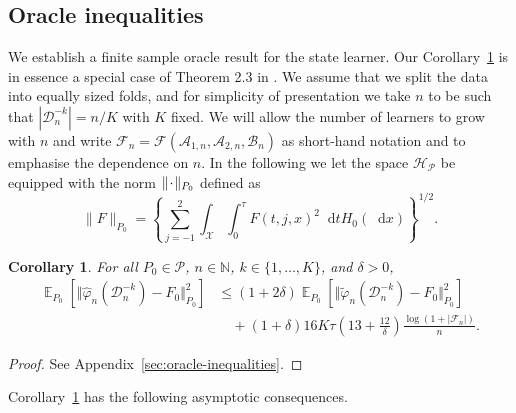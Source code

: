 \documentclass[a4paper,danish]{article}
\theoremstyle{plain} %
\numberwithin{theorem}{section}
\newtheorem{corollary}[theorem]{Corollary}
\theoremstyle{definition} %
\theoremstyle{remark}
\DeclareMathOperator{\E}{\mathbb{E}} %
\newcommand{\N}{\mathbb{N}}
\newcommand{\blank}{\makebox[1ex]{\textbf{$\cdot$}}}
\renewcommand{\phi}{\varphi}
\newcommand*\diff{\mathop{}\!\mathrm{d}}
\newcommand{\1}{\mathds{1}}
\newcommand{\data}{\ensuremath{\mathcal{D}}}
\begin{document}
\subsection{Oracle inequalities}
\label{sec:finite-sample-oracle}

We establish a finite sample oracle result for the state learner. Our
Corollary~\ref{cor:oracle-prop} is in essence a special case of
Theorem 2.3 in \citep{vaart2006oracle}.  We assume that we split the
data into equally sized folds, and for simplicity of presentation we
take \( n \) to be such that \( |\data_n^{-k}| = n/K \) with \( K \)
fixed. We will allow the number of learners to grow with \( n \) and
write
\( \mathcal{F}_n=\mathcal{F}(\mathcal{A}_{1,n}, \mathcal{A}_{2,n},
\mathcal{B}_n)\) as short-hand notation and to emphasise the
dependence on \( n \).
In the following we let the space \( \mathcal{H}_{\mathcal{P}} \) be equipped with the norm
\( \| \blank \|_{P_0} \) defined as
\begin{equation}
  \label{eq:norm}
  \| F \|_{P_0} = 
  \left\{
    \sum_{j=-1}^{2}\int_{\mathcal{X}} \int_0^{\tau} F(t, j, x)^2 \diff t H_0( \diff x)
  \right\}^{1/2}.
\end{equation}

\begin{corollary}
  \label{cor:oracle-prop}
  For all \(P_0\in\mathcal{P}\), \( n \in \N \), \( k \in \{1, \dots, K\} \),
  and $\delta>0$,
  \begin{align*}
    \E_{P_0}{\left[ \Vert \hat{\phi}_n(\data_n^{-k}) - F_0 \Vert_{P_0}^2 \right]}
    & \leq (1 + 2\delta)
      \E_{P_0}{\left[ \Vert \tilde{\phi}_n(\data_n^{-k}) - F_0 \Vert_{P_0}^2 \right]}
    \\
    & \quad
      + (1+ \delta) 16   K \tau
      \left(
      13 + \frac{12}{\delta}
      \right)
      \frac{\log(1 + |\mathcal{F}_n|)}{n}.
  \end{align*}
\end{corollary}
\begin{proof}
  See Appendix~\ref{sec:oracle-inequalities}.
\end{proof}

Corollary~\ref{cor:oracle-prop} has the following asymptotic consequences.
\end{document}
